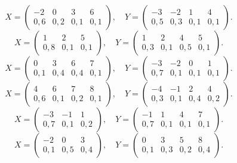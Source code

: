 $$ X = \left(\begin{array}{*{4}{c}} -2 & 0 & 3 & 6 \\ 0{,}6 & 0{,}2 & 0{,}1 & 0{,}1 \end{array}\right), \quad Y = \left(\begin{array}{*{4}{c}} -3 & -2 & 1 & 4 \\ 0{,}5 & 0{,}3 & 0{,}1 & 0{,}1 \end{array}\right). $$
$$ X = \left(\begin{array}{*{3}{c}} 1 & 2 & 5 \\ 0{,}8 & 0{,}1 & 0{,}1 \end{array}\right), \quad Y = \left(\begin{array}{*{4}{c}} 1 & 2 & 4 & 5 \\ 0{,}3 & 0{,}1 & 0{,}5 & 0{,}1 \end{array}\right). $$
$$ X = \left(\begin{array}{*{4}{c}} 0 & 3 & 6 & 7 \\ 0{,}1 & 0{,}4 & 0{,}4 & 0{,}1 \end{array}\right), \quad Y = \left(\begin{array}{*{4}{c}} -3 & -2 & 0 & 1 \\ 0{,}7 & 0{,}1 & 0{,}1 & 0{,}1 \end{array}\right). $$
$$ X = \left(\begin{array}{*{4}{c}} 4 & 6 & 7 & 8 \\ 0{,}6 & 0{,}1 & 0{,}2 & 0{,}1 \end{array}\right), \quad Y = \left(\begin{array}{*{4}{c}} -4 & -1 & 2 & 4 \\ 0{,}3 & 0{,}1 & 0{,}4 & 0{,}2 \end{array}\right). $$
$$ X = \left(\begin{array}{*{3}{c}} -3 & -1 & 1 \\ 0{,}7 & 0{,}1 & 0{,}2 \end{array}\right), \quad Y = \left(\begin{array}{*{4}{c}} -1 & 1 & 4 & 7 \\ 0{,}7 & 0{,}1 & 0{,}1 & 0{,}1 \end{array}\right). $$
$$ X = \left(\begin{array}{*{3}{c}} -2 & 0 & 3 \\ 0{,}1 & 0{,}5 & 0{,}4 \end{array}\right), \quad Y = \left(\begin{array}{*{4}{c}} 0 & 3 & 5 & 8 \\ 0{,}1 & 0{,}3 & 0{,}2 & 0{,}4 \end{array}\right). $$

